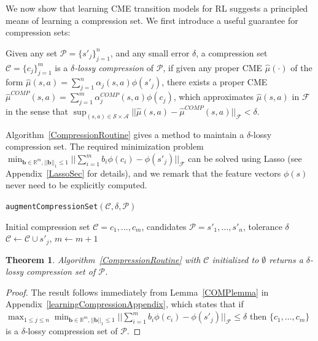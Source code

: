 \documentclass[letterpaper]{article}
\newtheorem{theorem}{Theorem}[section]
\newenvironment{definition}[1][Definition]{\begin{trivlist}
\item[\hskip \labelsep {\bfseries #1}]}{\end{trivlist}}
\newcommand{\cC}{{\mathcal C}}
\newcommand{\cF}{{\mathcal F}}
\newcommand{\cA}{{\mathcal A}}
\newcommand{\cS}{{\mathcal S}}
\newcommand{\cP}{{\mathcal P}}
\newcommand{\R}{{\mathbb R}}
\begin{document}
We now show that learning CME transition models for RL suggests a principled means of learning a compression set. We first introduce a useful guarantee for compression sets:

\begin{definition} \label{lossyCompression}
Given any set $\cP = \{s'_j\}_{j=1}^n$, and any small error $\delta$, a compression set $\cC=\{c_j\}_{j=1}^m$ is a \emph{$\delta$-lossy compression} of $\cP$, if given any proper CME $\hat\mu(\cdot)$ of the form $\hat\mu(s,a) = \sum_{j=1}^n \alpha_j(s,a) \phi(s'_j)$, there exists a proper CME $\hat\mu^{COMP}(s,a) = \sum_{j=1}^m \alpha^{COMP}_j(s,a) \phi(c_j)$, which approximates $\hat\mu(s,a)$ in $\cF$ in the sense that $\sup_{(s,a)\in\cS\times\cA}||\hat\mu(s,a) - \hat\mu^{COMP}(s,a)||_\cF < \delta$.
\end{definition}

Algorithm~\ref{CompressionRoutine} gives a method to maintain a $\delta$-lossy compression set. The required minimization problem $\min_{{\bm b}\in\R^m , ||{\bm b}||_1\le 1} ||\sum_{i=1}^m b_i \phi(c_i) - \phi(s'_j)||_{\cF}$ can be solved using Lasso (see Appendix~\ref{LassoSec} for details), and we remark that the feature vectors $\phi(s)$ never need to be explicitly computed.

\begin{algorithm}[htb]
   \caption{\texttt{augmentCompressionSet}$(\cC,\delta,\cP)$}
   \label{CompressionRoutine}
\begin{algorithmic}
     Initial compression set $\cC = {c_1,...,c_m}$, candidates $\cP = {s'_1,...,s'_n}$, tolerance $\delta$
	 \IF {$\min_{{\bm b}\in\R^m , ||{\bm b}||_1\le 1}\hspace{-0.6mm} ||\sum_{i=1}^m b_i \phi(c_i) \hspace{-0.6mm}-\hspace{-0.6mm} \phi(s'_j)||_{\cF} \hspace{-0.6mm}>\hspace{-0.6mm} \delta$}
	  $\cC \leftarrow \cC \cup s'_j$, $m\leftarrow m+1$
   \ENDIF
	\ENDFOR
\end{algorithmic}
\end{algorithm}

\begin{theorem} \label{CompressionTheorem}
Algorithm~\ref{CompressionRoutine} with $\cC$ initialized to $\emptyset$ returns a $\delta$-lossy compression set of $\cP$.
\end{theorem}
\begin{proof} The result follows immediately from Lemma~\ref{COMPlemma} in Appendix~\ref{learningCompressionAppendix},
which states that if $\max_{1\le j \le n } \min_{{\bm b}\in\R^m , ||{\bm b}||_1\le 1}
 ||\sum_{i=1}^m b_i \phi(c_i)-\phi(s'_j)||_{\cF}\le \delta$ then $\{c_1,\dots,c_m\}$ is a $\delta$-lossy compression set of $\cP$.
\end{proof}
\end{document}
